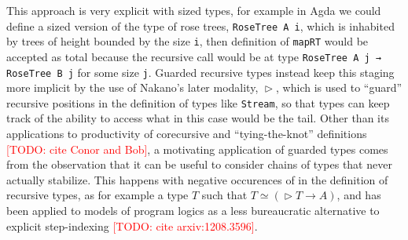 \documentclass{book}
\newcommand{\TODO}[1]{\textcolor{red}{[TODO: #1]}}
\DeclareMathOperator{\Later}{\vartriangleright}
\begin{document}
This approach is very explicit with sized types, for example in Agda
we could define a sized version of the type of rose trees,
\verb|RoseTree A i|, which is inhabited by trees of height bounded by
the size \verb|i|, then definition of \verb|mapRT| would be accepted
as total because the recursive call would be at type
\verb|RoseTree A j → RoseTree B j| for some size \verb|j|. Guarded
recursive types instead keep this staging more implicit by the use of
Nakano's later modality, $\Later$, which is used to ``guard''
recursive positions in the definition of types like \verb|Stream|, so
that types can keep track of the ability to access what in this case
would be the tail.  Other than its applications to productivity of
corecursive and ``tying-the-knot'' definitions \TODO{cite Conor and
  Bob}, a motivating application of guarded types comes from the
observation that it can be useful to consider chains of types that
never actually stabilize.  This happens with negative occurences of in
the definition of recursive types, as for example a type $T$ such that
$T \simeq (\Later T \to A)$, and has been applied to models of program
logics as a less bureaucratic alternative to explicit step-indexing
\TODO{cite arxiv:1208.3596}.



\end{document}
